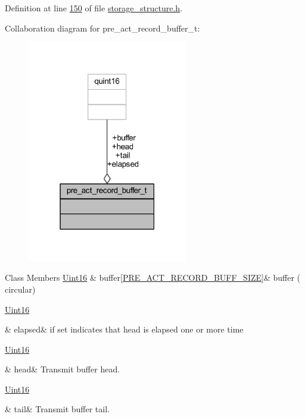 Definition at line \hyperlink{a00003_source_l00150}{150} of file \hyperlink{a00003_source}{storage\+\_\+structure.\+h}.



Collaboration diagram for pre\+\_\+act\+\_\+record\+\_\+buffer\+\_\+t\+:
\nopagebreak
\begin{figure}[H]
\begin{center}
\leavevmode
\includegraphics[width=198pt]{dd/df3/a00219}
\end{center}
\end{figure}
\begin{DoxyFields}{Class Members}
\hypertarget{a00003_a5f6608d29ecab36269ae25b2e7afb1f3}{\hyperlink{a00001_aae7407b021d43f7193a81a58cfb3e297}{Uint16}}\label{a00003_a5f6608d29ecab36269ae25b2e7afb1f3}
&
buffer\mbox{[}\hyperlink{a00003_a18dcecc16ded13fa622e0913e73442e6}{P\+R\+E\+\_\+\+A\+C\+T\+\_\+\+R\+E\+C\+O\+R\+D\+\_\+\+B\+U\+F\+F\+\_\+\+S\+I\+Z\+E}\mbox{]}&
buffer ( circular) \\
\hline

\hypertarget{a00003_aaaf7d02164534ccd9a0f797aa73c624c}{\hyperlink{a00001_aae7407b021d43f7193a81a58cfb3e297}{Uint16}}\label{a00003_aaaf7d02164534ccd9a0f797aa73c624c}
&
elapsed&
if set indicates that head is elapsed one or more time \\
\hline

\hypertarget{a00003_a4ffd130ffd2d0b15b3e187aaa678f475}{\hyperlink{a00001_aae7407b021d43f7193a81a58cfb3e297}{Uint16}}\label{a00003_a4ffd130ffd2d0b15b3e187aaa678f475}
&
head&
Transmit buffer head. \\
\hline

\hypertarget{a00003_a3c4762f0dfae85a9efc17a36c6cb84a6}{\hyperlink{a00001_aae7407b021d43f7193a81a58cfb3e297}{Uint16}}\label{a00003_a3c4762f0dfae85a9efc17a36c6cb84a6}
&
tail&
Transmit buffer tail. \\
\hline

\end{DoxyFields}
\label{df/d5f/a00064}
\hypertarget{a00003_df/d5f/a00064}{}

